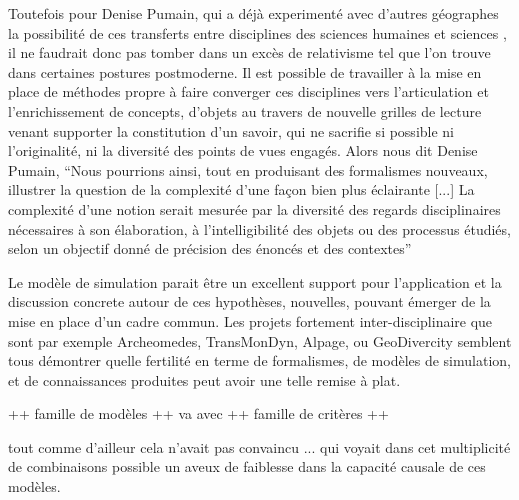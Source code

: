 Toutefois pour Denise Pumain, qui a déjà experimenté avec d'autres géographes la possibilité de ces transferts entre disciplines des sciences humaines et sciences \autocites{Pumain1989,Sanders1992, Dastes1998}, il ne faudrait donc pas tomber dans un excès de relativisme tel que l'on trouve dans certaines postures postmoderne. Il est possible de travailler à la mise en place de méthodes  propre à faire converger ces disciplines vers l'articulation et l'enrichissement de concepts, d'objets au travers de nouvelle grilles de lecture venant supporter la constitution d'un savoir, qui ne sacrifie si possible ni l'originalité, ni la diversité des points de vues engagés. Alors nous dit Denise Pumain, \enquote{Nous pourrions ainsi, tout en produisant des formalismes nouveaux, illustrer la question de la complexité d’une façon bien plus éclairante [...] La complexité d’une notion serait mesurée par la diversité des regards disciplinaires nécessaires à son élaboration, à l’intelligibilité des objets ou des processus étudiés, selon un objectif donné de précision des énoncés et des contextes}

Le modèle de simulation parait être un excellent support pour l'application et la discussion concrete autour de ces hypothèses, nouvelles, pouvant émerger de la mise en place d'un cadre commun. Les projets fortement inter-disciplinaire que sont par exemple Archeomedes, TransMonDyn, Alpage, ou GeoDivercity \autocite{Chapron2014} semblent tous démontrer quelle fertilité en terme de formalismes, de modèles de simulation, et de connaissances produites peut avoir une telle remise à plat.

++ famille de modèles ++ va avec
++ famille de critères ++ 



 

tout comme d'ailleur cela n'avait pas convaincu ...  qui voyait dans cet multiplicité de combinaisons possible un aveux de faiblesse dans la capacité causale de ces modèles. 






